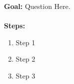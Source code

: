 \documentclass[../../header.tex]{subfiles}
\begin{document}
\textbf{Goal:} Question Here.
\\
\\
\textbf{Steps:}
	\begin{enumerate}
		\item Step 1\\
		
		\item Step 2\\
		
		\item Step 3\\
	
	\end{enumerate}
\end{document}
